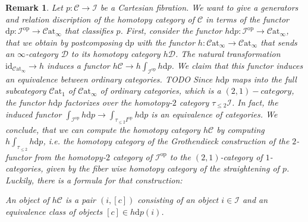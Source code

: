 \documentclass{article}
\newcommand{\cC}{\mathcal{C}}
\newcommand{\cD}{\mathcal{D}}
\newcommand{\op}{\mathrm{op}}
\newcommand{\id}{\mathrm{id}}
\newcommand{\catinfty}{\mathcal{C}\mathrm{at}_{\infty}}
\newtheorem{remark}{Remark}
\begin{document}
  \begin{remark}
  Let $p \colon \cC \to \mathcal I$ be a Cartesian fibration. We want to give a generators and 
  relation discription 
  of the homotopy category of $\cC$ in terms of the functor ${\mathrm{d}} p \colon \mathcal I^\op \to \catinfty$ that 
  classifies $p$. 
  First, consider the functor $h {\mathrm{d}} p \colon \mathcal I^\op \to \catinfty$, that 
  we obtain by postcomposing ${\mathrm{d}} p$ with the functor $h \colon \catinfty \to \catinfty$
  that sends an $\infty$-category $\cD$ to its homotopy category $h\cD$.
  The natural transformation $\id_{\catinfty} \to h$ induces a functor 
  $h\cC \to h\int_{\mathcal I^\op} h {\mathrm{d}} p$.
  We claim that this functor induces an equivalence between ordinary categories.
  TODO 
  Since $h {\mathrm{d}} p$ maps into the full subcategory $\mathcal{C}\mathrm{at}_1$ of 
  $\catinfty$ of ordinary categories, which is a $(2,1)-category$, the functor $h {\mathrm{d}} p$
  factorizes over the homotopy-$2$ category $\tau_{\leq 2} \mathcal I$. 
  In fact, the induced functor $\int_{\mathcal I^\op} h {\mathrm{d}} p 
  \to \int_{\mathcal \tau_{\leq 2}I^\op} h {\mathrm{d}} p $ is an 
  equivalence of categories.
  We conclude, that we can compute the homotopy category $h\cC$ by computing 
  $h \int_{\tau_{\leq 2}} h {\mathrm{d}} p$, i.e. the homotopy category 
  of the Grothendieck construction of the $2$-functor from the homotopy-$2$ category of 
  $\mathcal I^\op$ to the $(2,1)$-category of $1$-categories, given by the 
  fiber wise homotopy category of the straightening of $p$. 
  Luckily, there is a formula for that construction:
  
  An object of $h\cC$ is a pair $(i, [c])$ consisting of an object $i \in \mathcal I$
  and an equivalence class of objects $[c] \in h {\mathrm{d}} p(i)$.
  

\end{remark}
\end{document}
